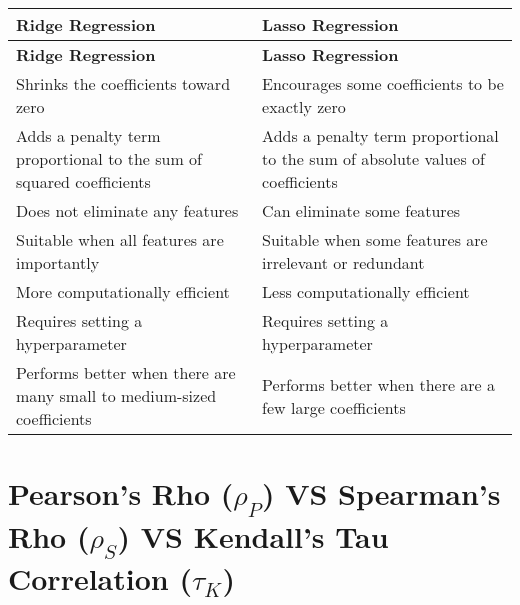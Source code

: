 \begin{longtable}{|p{7cm}|p{7cm}|}
    \hline
    \textbf{Ridge Regression} & \textbf{Lasso Regression}\\
    \hline
    \endfirsthead
    
    \hline
    \textbf{Ridge Regression} & \textbf{Lasso Regression}\\
    \hline
    \endhead

    \hline\endfoot
    \hline\endlastfoot

    Shrinks the coefficients toward zero & Encourages some coefficients to be exactly zero\\
    \hline

    Adds a penalty term proportional to the sum of squared coefficients & Adds a penalty term proportional to the sum of absolute values of coefficients \\
    \hline

    Does not eliminate any features & Can eliminate some features \\
    \hline

    Suitable when all features are importantly & Suitable when some features are irrelevant or redundant\\
    \hline

    More computationally efficient & Less computationally efficient\\
    \hline

    Requires setting a hyperparameter & Requires setting a hyperparameter\\
    \hline

    Performs better when there are many small to medium-sized coefficients & Performs better when there are a few large coefficients\\
    \hline
\end{longtable}


\section{Pearson’s Rho ($\rho_P$) VS Spearman’s Rho ($\rho_S$) VS Kendall’s Tau Correlation ($\tau_K$)} \label{Pearson’s Rho VS Spearman’s Rho VS Kendall’s Tau Correlation}

